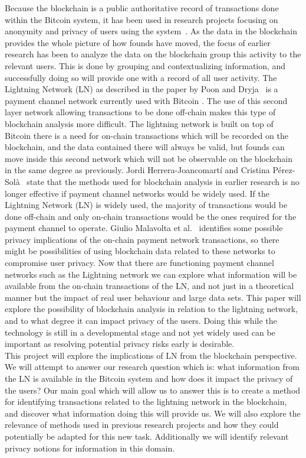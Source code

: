 Because the blockchain is a public authoritative record of transactions done within the Bitcoin system, it has been used in research projects focusing on anonymity and privacy of users using the system~\cite{reid2013analysis,meiklejohn2013fistful}. As the data in the blockchain provides the whole picture of how founds have moved, the focus of earlier research has been to analyze the data on the blockchain group this activity to the relevant users. This is done by grouping and contextualizing information, and successfully doing so will provide one with a record of all user activity. 
The Lightning Network (LN) as described in the paper by Poon and Dryja~\cite{poon2015bitcoin} is a payment channel network currently used with Bitcoin . The use of this second layer network allowing transactions to be done off-chain makes this type of blockchain analysis more difficult. The lightning network is built on top of Bitcoin there is a need for on-chain transactions which will be recorded on the blockchain, and the data contained there will always be valid, but founds can move inside this second network which will not be observable on the blockchain in the same degree as previously. Jordi Herrera-Joancomartí and Cristina Pérez-Solà~\cite{herrera2015research} state that the methods used for blockchain analysis in earlier research is no longer effective if payment channel networks would be widely used. If the Lightning Network (LN) is widely used, the majority of transactions would be done off-chain and only on-chain transactions would be the ones required for the payment channel to operate. Giulio Malavolta et al.~\cite{malavolta2017concurrency} identifies some possible privacy implications of the on-chain payment network transactions, so there might be possibilities of using blockchain data related to these networks to compromise user privacy. Now that there are functioning payment channel networks such as the Lightning network we can explore what information will be available from the on-chain transactions of the LN, and not just in a theoretical manner but the impact of real user behaviour and large data sets. This paper will explore the possibility of blockchain analysis in relation to the lightning network, and to what degree it can impact privacy of the users. Doing this while the technology is still in a developmental stage and not yet widely used can be important as resolving potential privacy risks early is desirable.
\\

This project will explore the implications of LN from the blockchain perspective.
We will attempt to answer our research question which is: what information from the LN is available in the Bitcoin system and how does it impact the privacy of the users?
Our main goal which will allow us to answer this is to create a method for identifying transactions related to the lightning network in the blockchain, and discover what information doing this will provide us.
We will also explore the relevance of methods used in previous research projects and how they could potentially be adapted for this new task. Additionally we will identify relevant privacy notions for information in this domain.

